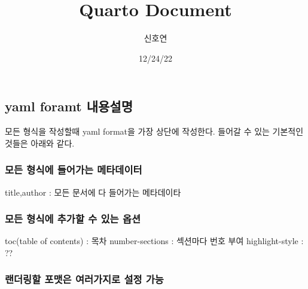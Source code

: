 \documentclass[
  letterpaper,
  DIV=11,
  numbers=noendperiod]{scrartcl}
\title{Quarto Document}
\author{신호연}
\date{12/24/22}
\renewcommand*\contentsname{Table of contents}
\newcommand\contentsname{Table of contents}
\begin{document}
\maketitle
\ifdefined\Shaded\renewenvironment{Shaded}{\begin{tcolorbox}[sharp corners, interior hidden, frame hidden, boxrule=0pt, borderline west={3pt}{0pt}{shadecolor}, enhanced, breakable]}{\end{tcolorbox}}\fi

\renewcommand*\contentsname{Table of contents}
{
\hypersetup{linkcolor=}
\setcounter{tocdepth}{3}
\tableofcontents
}
\hypertarget{yaml-foramt-uxb0b4uxc6a9uxc124uxba85}{%
\subsection{yaml foramt
내용설명}\label{yaml-foramt-uxb0b4uxc6a9uxc124uxba85}}

모든 형식을 작성할때 yaml format을 가장 상단에 작성한다. 들어갈 수 있는
기본적인 것들은 아래와 같다.

\hypertarget{uxbaa8uxb4e0-uxd615uxc2dduxc5d0-uxb4e4uxc5b4uxac00uxb294-uxba54uxd0c0uxb370uxc774uxd130}{%
\subsubsection{모든 형식에 들어가는
메타데이터}\label{uxbaa8uxb4e0-uxd615uxc2dduxc5d0-uxb4e4uxc5b4uxac00uxb294-uxba54uxd0c0uxb370uxc774uxd130}}

title,author : 모든 문서에 다 들어가는 메타데이타

\hypertarget{uxbaa8uxb4e0-uxd615uxc2dduxc5d0-uxcd94uxac00uxd560-uxc218-uxc788uxb294-uxc635uxc158}{%
\subsubsection{모든 형식에 추가할 수 있는
옵션}\label{uxbaa8uxb4e0-uxd615uxc2dduxc5d0-uxcd94uxac00uxd560-uxc218-uxc788uxb294-uxc635uxc158}}

toc(table of contents) : 목차 number-sections : 섹션마다 번호 부여
highlight-style : ??

\hypertarget{uxb79cuxb354uxb9c1uxd560-uxd3ecuxb9f7uxc740-uxc5ecuxb7ecuxac00uxc9c0uxb85c-uxc124uxc815-uxac00uxb2a5}{%
\subsubsection{랜더링할 포맷은 여러가지로 설정
가능}\label{uxb79cuxb354uxb9c1uxd560-uxd3ecuxb9f7uxc740-uxc5ecuxb7ecuxac00uxc9c0uxb85c-uxc124uxc815-uxac00uxb2a5}}
\end{document}
